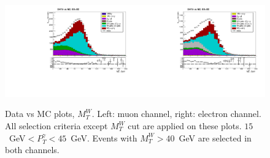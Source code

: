\begin{figure}[htb]
  \begin{center}
   \includegraphics[width=0.5\textwidth]{../figs/figs_v11/MUON_WGamma/PrepareYields/c_TotalDATAvsMC_EtaCommon__WMtVERY_PRELIMINARY.pdf}\includegraphics[width=0.5\textwidth]{../figs/figs_v11/ELECTRON_WGamma/PrepareYields/c_TotalDATAvsMC_EtaCommon__WMtVERY_PRELIMINARY.pdf}
  \caption{Data vs MC plots, $M_T^W$. Left: muon channel, right: electron channel. All selection criteria except $M_{T}^W$ cut are applied on these plots. $15$~GeV$<P_T^{\gamma}<45$~GeV. Events with $M_{T}^W>40$~GeV are selected in both channels.}
  \label{fig:DATAvsMC_WMt}
  \end{center}
\end{figure}

